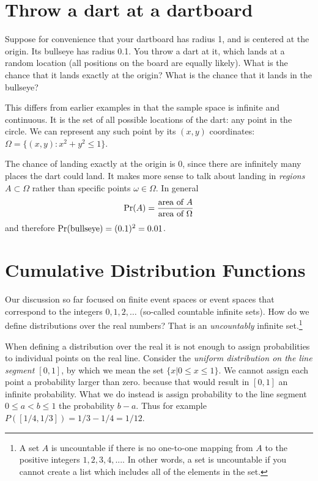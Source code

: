 \section{Throw a dart at a dartboard} 

Suppose for convenience that your dartboard has radius 1, and is
centered at the origin. Its bullseye has radius 0.1. You throw a dart
at it, which lands at a random location (all positions on the board
are equally likely). What is the chance that it lands exactly at the
origin? What is the chance that it lands in the bullseye?

This differs from earlier examples in that the sample space is infinite and continuous. It is the set of all possible locations of the dart: any point in the circle. We can represent any such point by its $(x,y)$ coordinates: $\Omega = \{(x,y): x^2 + y^2 \leq 1\}$.

The chance of landing exactly at the origin is 0, since there are infinitely many places the dart could land. It makes more sense to talk about landing in {\it regions} $A \subset \Omega$ rather than specific points $\omega \in \Omega$. In general
$$ \mbox{\rm Pr}(A) = \frac{\mbox{area of $A$}}{\mbox{area of $\Omega$}} $$
and therefore $\mbox{\rm Pr}(\mbox{bullseye}) = (0.1)^2 = 0.01$.

\section{Cumulative Distribution Functions}

Our discussion so far focused on finite event spaces or event spaces
that correspond to the integers $0,1,2,\ldots$ (so-called countable
infinite sets). How do we define distributions over the real numbers?
That is an {\em uncountably} infinite set.\footnote{A set $A$ is
  uncountable if there is no one-to-one mapping from $A$ to the
  positive integers $1,2,3,4,...$. In other words, a set is
  uncountable if you cannot create a list which includes all of the
  elements in the set.}

When defining a distribution over the real it is not enough to assign
probabilities to individual points on the real line. Consider the {\em
  uniform distribution on the line segment $[0,1]$}, by which
we mean the set $\{x | 0 \leq x \leq 1\}$. We cannot assign each
point a probability larger than zero. because that would result in
$[0,1]$ an infinite probability. What we do instead is assign
probability to the line segment $0 \leq a < b \leq 1$ the probability
$b-a$. Thus for example $P([1/4,1/3])=1/3-1/4 = 1/12$.

